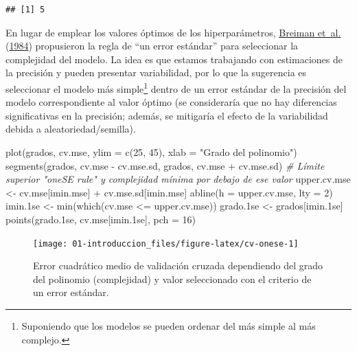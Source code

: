 \documentclass[
  spanish,
]{book}
\newenvironment{Shaded}{\begin{snugshade}}{\end{snugshade}}
\newcommand{\AttributeTok}[1]{\textcolor[rgb]{0.77,0.63,0.00}{#1}}
\newcommand{\CommentTok}[1]{\textcolor[rgb]{0.56,0.35,0.01}{\textit{#1}}}
\newcommand{\DecValTok}[1]{\textcolor[rgb]{0.00,0.00,0.81}{#1}}
\newcommand{\FloatTok}[1]{\textcolor[rgb]{0.00,0.00,0.81}{#1}}
\newcommand{\FunctionTok}[1]{\textcolor[rgb]{0.00,0.00,0.00}{#1}}
\newcommand{\NormalTok}[1]{#1}
\newcommand{\OtherTok}[1]{\textcolor[rgb]{0.56,0.35,0.01}{#1}}
\newcommand{\SpecialCharTok}[1]{\textcolor[rgb]{0.00,0.00,0.00}{#1}}
\newcommand{\StringTok}[1]{\textcolor[rgb]{0.31,0.60,0.02}{#1}}
\theoremstyle{break}
\theoremstyle{definition}
\theoremstyle{definition}
\theoremstyle{definition}
\theoremstyle{definition}
\theoremstyle{remark}
\begin{document}
\begin{verbatim}
## [1] 5
\end{verbatim}

En lugar de emplear los valores óptimos de los hiperparámetros, \protect\hyperlink{ref-breiman1984classification}{Breiman et~al.} (\protect\hyperlink{ref-breiman1984classification}{1984}) propusieron la regla de ``un error estándar'' para seleccionar la complejidad del modelo.
La idea es que estamos trabajando con estimaciones de la precisión y pueden presentar variabilidad,
por lo que la sugerencia es seleccionar el modelo más simple\footnote{Suponiendo que los modelos se pueden ordenar del más simple al más complejo.} dentro de un error estándar de la precisión del modelo correspondiente al valor óptimo
(se consideraría que no hay diferencias significativas en la precisión;
además, se mitigaría el efecto de la variabilidad debida a aleatoriedad/semilla).

\begin{Shaded}
\begin{Highlighting}[]
\FunctionTok{plot}\NormalTok{(grados, cv.mse, }\AttributeTok{ylim =} \FunctionTok{c}\NormalTok{(}\DecValTok{25}\NormalTok{, }\DecValTok{45}\NormalTok{),}
  \AttributeTok{xlab =} \StringTok{"Grado del polinomio"}\NormalTok{)}
\FunctionTok{segments}\NormalTok{(grados, cv.mse }\SpecialCharTok{{-}}\NormalTok{ cv.mse.sd, grados, cv.mse }\SpecialCharTok{+}\NormalTok{ cv.mse.sd)}
\CommentTok{\# Límite superior "oneSE rule" y complejidad mínima por debajo de ese valor}
\NormalTok{upper.cv.mse }\OtherTok{\textless{}{-}}\NormalTok{ cv.mse[imin.mse] }\SpecialCharTok{+}\NormalTok{ cv.mse.sd[imin.mse]}
\FunctionTok{abline}\NormalTok{(}\AttributeTok{h =}\NormalTok{ upper.cv.mse, }\AttributeTok{lty =} \DecValTok{2}\NormalTok{)}
\NormalTok{imin}\FloatTok{.1}\NormalTok{se }\OtherTok{\textless{}{-}} \FunctionTok{min}\NormalTok{(}\FunctionTok{which}\NormalTok{(cv.mse }\SpecialCharTok{\textless{}=}\NormalTok{ upper.cv.mse))}
\NormalTok{grado}\FloatTok{.1}\NormalTok{se }\OtherTok{\textless{}{-}}\NormalTok{ grados[imin}\FloatTok{.1}\NormalTok{se]}
\FunctionTok{points}\NormalTok{(grado}\FloatTok{.1}\NormalTok{se, cv.mse[imin}\FloatTok{.1}\NormalTok{se], }\AttributeTok{pch =} \DecValTok{16}\NormalTok{)}
\end{Highlighting}
\end{Shaded}

\begin{figure}[!htb]

{\centering \texttt{[image: 01-introduccion\_files/figure-latex/cv-onese-1]} 

}

\caption{Error cuadrático medio de validación cruzada dependiendo del grado del polinomio (complejidad) y valor seleccionado con el criterio de un error estándar.}\label{fig:cv-onese}
\end{figure}
\end{document}
